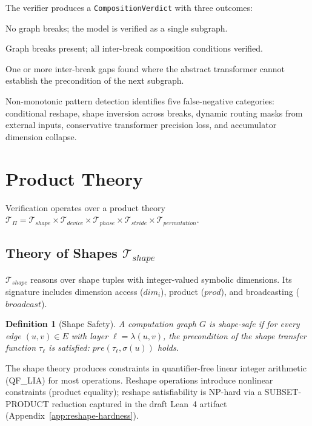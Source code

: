 \documentclass[11pt]{article}
\newtheorem{definition}[theorem]{Definition}
\begin{document}
The verifier produces a \texttt{CompositionVerdict} with three outcomes:
\begin{description}[leftmargin=2em,nosep]
  \item[\textsc{Monolithic-Safe}:] No graph breaks; the model is
    verified as a single subgraph.
  \item[\textsc{Composition-Verified}:] Graph breaks present; all
    inter-break composition conditions verified.
  \item[\textsc{Gap-Detected}:] One or more inter-break gaps found
    where the abstract transformer cannot establish the precondition
    of the next subgraph.
\end{description}

\noindent
Non-monotonic pattern detection identifies five false-negative
categories: conditional reshape, shape inversion across breaks,
dynamic routing masks from external inputs, conservative transformer
precision loss, and accumulator dimension collapse.


\section{Product Theory}\label{sec:theory}

Verification operates over a product theory
$\mathcal{T}_\Pi = \mathcal{T}_{\mathit{shape}} \times
\mathcal{T}_{\mathit{device}} \times \mathcal{T}_{\mathit{phase}}
\times \mathcal{T}_{\mathit{stride}} \times \mathcal{T}_{\mathit{permutation}}$.

\subsection{Theory of Shapes $\mathcal{T}_{\mathit{shape}}$}

$\mathcal{T}_{\mathit{shape}}$ reasons over shape tuples with
integer-valued symbolic dimensions.  Its signature includes
dimension access ($\mathit{dim}_i$), product ($\mathit{prod}$),
and broadcasting ($\mathit{broadcast}$).

\begin{definition}[Shape Safety]
A computation graph $G$ is \emph{shape-safe} if for every edge
$(u,v) \in E$ with layer $\ell = \lambda(u,v)$, the precondition
of the shape transfer function $\tau_\ell$ is satisfied:
$\mathit{pre}(\tau_\ell, \sigma(u))$ holds.
\end{definition}

The shape theory produces constraints in quantifier-free linear
integer arithmetic (QF\_LIA) for most operations.  Reshape
operations introduce nonlinear constraints (product equality);
reshape satisfiability is NP-hard via a SUBSET-PRODUCT reduction
captured in the draft Lean~4 artifact (Appendix~\ref{app:reshape-hardness}).
\end{document}

